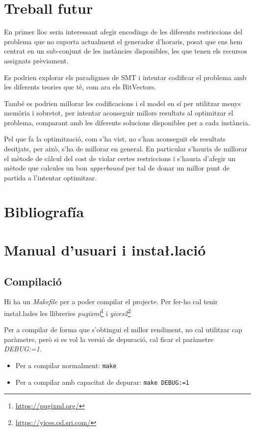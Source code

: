 \documentclass[11pt,a4paper,twoside]{report}
\begin{document}
  \chapter{Treball futur}

  En primer lloc seria interessant afegir encodings de les diferents restriccions del problema que no suporta actualment el generador d'horaris, posat que ens hem centrat en un sub-conjunt de les instàncies disponibles, les que tenen els recursos assignats prèviament.

  Es podrien explorar els paradigmes de SMT i intentar codificar el problema amb les diferents teories que té, com ara els BitVectors.

  També es podrien millorar les codificacions i el model en sí per utilitzar menys memòria i sobretot, per intentar aconseguir millors resultats al optimitzar el problema, comparant amb les diferents solucions disponibles per a cada instància.

  Pel que fa la optimització, com s'ha vist, no s'han aconseguit els resultats desitjats, per això, s'ha de millorar en general. En particular s'hauria de millorar el mètode de càlcul del cost de violar certes restriccions i s'hauria d'afegir un mètode que calcules un bon \textit{upperbound} per tal de donar un millor punt de partida a l'intentar optimitzar.

  \nocite{*}
  \chapter{Bibliografía}
  \printbibliography[heading=none]
  \chapter{Manual d'usuari i insta\l.lació}

  \section{Compilació}

  Hi ha un \textit{Makefile} per a poder compilar el projecte. Per fer-ho cal tenir insta\l.lades les llibreries \textit{pugixml}\footnote{\url{https://pugixml.org/}} i \textit{yices2}\footnote{\url{https://yices.csl.sri.com/}}
  
  Per a compilar de forma que s'obtingui el millor rendiment, no cal utilitzar cap paràmetre, però si es vol la versió de depuració, cal ficar el paràmetre \textit{DEBUG:=1}.
  \begin{center}
  \begin{itemize}
    \item Per a compilar normalment: \texttt{make}
    \item Per a compilar amb capacitat de depurar: \texttt{make DEBUG:=1}
  \end{itemize}
  \end{center}
\end{document}
